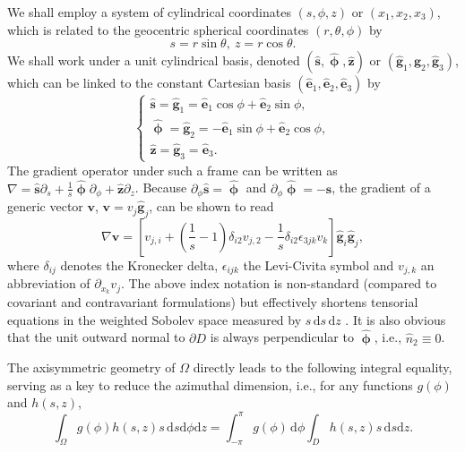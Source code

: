 \documentclass[extra]{gji}
\begin{document}
We shall employ a system of cylindrical coordinates $\left(s,\phi,z\right)$
or $\left(x_1,x_2,x_3\right)$, which is related to the geocentric spherical 
coordinates $\left(r,\theta,\phi\right)$ by
\begin{equation}
  s=r\sin\theta,\ z=r\cos\theta.
\end{equation}
We shall work under a unit cylindrical basis, denoted  
$\left(\hat{\mathbf{s}},\hat{\mathbf{\upphi}},\hat{\mathbf{z}}\right)$
or $\left(\hat{\mathbf{g}}_{1},\hat{\mathbf{g}}_{2},\hat{\mathbf{g}}_{3}\right)$, 
which can be linked to the constant Cartesian basis 
$\left(\hat{\mathbf{e}}_{1},\hat{\mathbf{e}}_{2},\hat{\mathbf{e}}_{3}\right)$ by
\begin{equation}
  \begin{cases}
    \hat{\mathbf{s}}=\hat{\mathbf{g}}_1=\hat{\mathbf{e}}_{1}\cos\phi 
    + \hat{\mathbf{e}}_{2}\sin\phi, \\
    \hat{\mathbf{\upphi}}=\hat{\mathbf{g}}_2=-\hat{\mathbf{e}}_{1}\sin\phi 
    + \hat{\mathbf{e}}_{2}\cos\phi, \\
    \hat{\mathbf{z}}=\hat{\mathbf{g}}_3=\hat{\mathbf{e}}_3.
  \end{cases}
\end{equation}
The gradient operator under such a frame can be written as
$\nabla=\hat{\mathbf{s}}\partial_{s}+
\frac{1}{s}\hat{\mathbf{\upphi}}\partial_{\phi}+
\hat{\mathbf{z}}\partial_{z}$.
Because $\partial_{\phi}\hat{\mathbf{s}}=\hat{\mathbf{\upphi}}$ and 
$\partial_{\phi}\hat{\mathbf{\upphi}}=-\hat{\mathbf{s}}$,
the gradient of a generic vector $\mathbf{v}$, 
$\mathbf{v}=v_{j}\hat{\mathbf{g}}_{j}$, can be shown to read
\begin{equation}
\nabla\mathbf{v}=\left[v_{j,i}+\left(\frac{1}{s}-1\right)\delta_{i2}v_{j,2}
-\frac{1}{s}\delta_{i2}\epsilon_{3jk}v_{k}\right]
\hat{\mathbf{g}}_{i}\hat{\mathbf{g}}_{j},
\label{eq:grad}
\end{equation}
where $\delta_{ij}$ denotes the Kronecker delta, $\epsilon_{ijk}$ the
Levi-Civita symbol and $v_{j,k}$ an abbreviation of $\partial_{x_k}v_j$.
The above index notation is non-standard (compared to covariant and
contravariant formulations) but effectively shortens tensorial
equations in the weighted Sobolev space measured by $s\,\text{d}s\,\text{d}z$ 
\cite[Chap 2,][]{bernardi1999spectral}. 
It is also obvious that the unit outward
normal to $\partial D$ is always perpendicular to $\hat{\mathbf{\upphi}}$,
i.e., $\hat{n}_{2}\equiv0$.

The axisymmetric geometry of $\Omega$ directly leads to the following integral
equality, serving as a key to reduce the azimuthal dimension, 
i.e., for any functions $g(\phi)$ and $h(s,z)$, 
\begin{equation}
\int_{\Omega}g(\phi)h(s,z)s\,\text{d}s \text{d}\phi \text{d}z=
\int_{-\pi}^{\pi}g(\phi)\,\text{d}\phi\int_{D}h(s,z)s\,\text{d}s\text{d}z.
\label{eq:ieq}
\end{equation}
\end{document}

